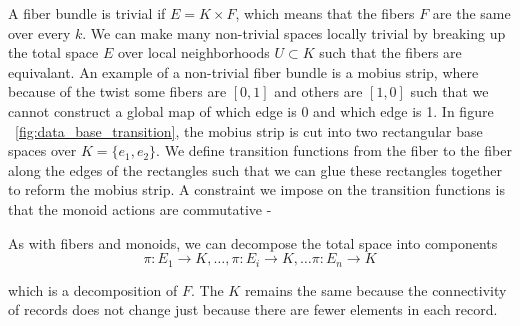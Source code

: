 \documentclass[../main.tex]{subfiles}
\begin{document}
A fiber bundle is trivial if $E = K\times F$, which means that the fibers $F$ are the same over every $k$. We can make many non-trivial spaces locally trivial by breaking up the total space $E$ over local neighborhoods $U \subset K$ such that the fibers are equivalant. An example of a non-trivial fiber bundle is a mobius strip, where because of the twist some fibers are $\left[0,1\right]$ and others are $\left[1,0\right]$ such that we cannot construct a global map of which edge is 0 and which edge is 1.  In figure ~\ref{fig:data_base_transition}, the mobius strip is cut into two rectangular base spaces over $K=\{e_1, e_2\}$. We define transition functions from the fiber to the fiber along the edges of the rectangles such that we can glue these rectangles together to reform the mobius strip. A constraint we impose on the transition functions is that the monoid actions are commutative
-%

As with fibers and monoids, we can decompose the total space into components 
\begin{equation}
    \pi: E_1 \rightarrow K, \ldots, \pi: E_i \rightarrow K, \ldots \pi: E_n \rightarrow K
\end{equation}

which is a decomposition of $F$. The $K$ remains the same because the connectivity of records does not change just because there are fewer elements in each record.
\end{document}
